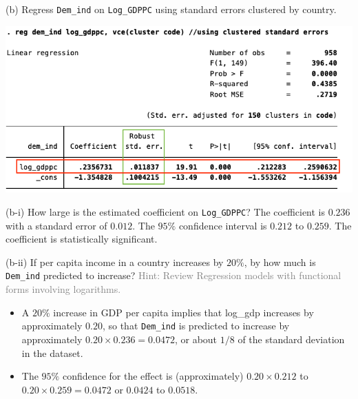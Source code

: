 \documentclass[
  10pt,
  ignorenonframetext,
]{beamer}
\begin{document}
\begin{frame}{(b) Regress \texttt{Dem\_ind} on \texttt{Log\_GDPPC} using
standard errors clustered by country.}
\protect\hypertarget{b-regress-dem_ind-on-log_gdppc-using-standard-errors-clustered-by-country.}{}
\begin{flushleft}\includegraphics[width=0.9\linewidth]{pictures/Ex2-pooledsimplewithclustering} \end{flushleft}
\end{frame}

\begin{frame}{(b-i) How large is the estimated coefficient on
\texttt{Log\_GDPPC}?}
\protect\hypertarget{b-i-how-large-is-the-estimated-coefficient-on-log_gdppc}{}
The coefficient is \(0.236\) with a standard error of \(0.012\). The
\(95\%\) confidence interval is \(0.212\) to \(0.259\). The coefficient
is statistically significant.
\end{frame}

\begin{frame}[fragile]{(b-ii) If per capita income in a country
increases by \(20\%\), by how much is \texttt{Dem\_ind} predicted to
increase?}
\protect\hypertarget{b-ii-if-per-capita-income-in-a-country-increases-by-20-by-how-much-is-dem_ind-predicted-to-increase}{}
\footnotesize \textcolor{gray}{Hint: Review Regression models with functional forms involving logarithms.}
\normalsize

\begin{itemize}
\item
  A \(20\%\) increase in GDP per capita implies that log\_gdp increases
  by approximately \(0.20\), so that \texttt{Dem\_ind} is predicted to
  increase by approximately \(0.20\times0.236 = 0.0472\), or about
  \(1/8\) of the standard deviation in the dataset.
\item
  The \(95\%\) confidence for the effect is (approximately)
  \(0.20\times0.212\) to \(0.20\times0.259 = 0.0472\) or \(0.0424\) to
  \(0.0518\).
\end{itemize}
\end{frame}
\end{document}

